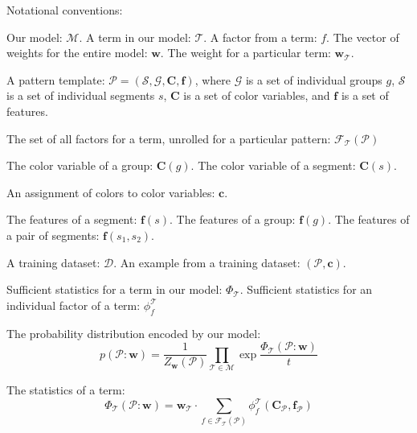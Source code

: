 
\newcommand{\pattern}{\mathcal{P}}
\newcommand{\group}{g}
\newcommand{\groups}{\mathcal{G}}
\newcommand{\segment}{s}
\newcommand{\segments}{\mathcal{S}}
\newcommand{\model}{\mathcal{M}}
\newcommand{\term}{\mathcal{T}}
\newcommand{\factor}{f}
\newcommand{\factors}{\mathcal{F}_\term}
\newcommand{\weights}{\mathbf{w}}
\newcommand{\dataset}{\mathcal{D}}
\newcommand{\variable}[1]{\mathbf{#1}}
\newcommand{\colorVars}{\variable{C}}
\newcommand{\colors}{\variable{c}}
\newcommand{\features}{\variable{f}}
\newcommand{\termStats}{\Phi_\term}
\newcommand{\factorStats}{\phi^\term_\factor}
\newcommand{\expectation}{\mathds{E}}

Notational conventions:

Our model: $\model$. A term in our model: $\term$. A factor from a term: $\factor$. The vector of weights for the entire model: $\weights$. The weight for a particular term: $\weights_\term$.

A pattern template: $\pattern = (\segments, \groups, \colorVars, \features)$, where $\groups$ is a set of individual groups $\group$, $\segments$ is a set of individual segments $\segment$, $\colorVars$ is a set of color variables, and $\features$ is a set of features.

The set of all factors for a term, unrolled for a particular pattern: $\factors(\pattern)$

The color variable of a group: $\colorVars(\group)$. The color variable of a segment: $\colorVars(\segment)$.

An assignment of colors to color variables: $\colors$.

The features of a segment: $\features(\segment)$. The features of a group: $\features(\group)$. The features of a pair of segments: $\features(\segment_1, \segment_2)$.

A training dataset: $\dataset$. An example from a training dataset: $(\pattern, \colors)$.

Sufficient statistics for a term in our model: $\termStats$. Sufficient statistics for an individual factor of a term: $\factorStats$

The probability distribution encoded by our model:
\begin{equation*}
p(\pattern : \weights) = \frac{1}{Z_\weights(\pattern)} \prod_{\term \in \model} \exp{\frac{\termStats(\pattern : \weights)}{t}}
\end{equation*}

The statistics of a term:
\begin{equation*}
\termStats(\pattern : \weights) = \weights_\term \cdot \sum_{\factor \in \factors(\pattern)} \factorStats(\colorVars_\pattern, \features_\pattern)
\end{equation*}